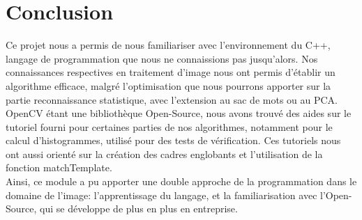\documentclass[10pt,a4paper]{report}
\begin{document}
\section{Conclusion}
Ce projet nous a permis de nous familiariser avec l'environnement du C++, langage de programmation que nous ne connaissions pas jusqu'alors. Nos connaissances respectives en traitement d'image nous ont permis d'établir un algorithme efficace, malgré l'optimisation que nous pourrons apporter sur la partie reconnaissance statistique, avec l'extension au sac de mots ou au PCA.\\
OpenCV étant une bibliothèque Open-Source, nous avons trouvé des aides sur le tutoriel fourni pour certaines parties de nos algorithmes, notamment pour le calcul d'histogrammes, utilisé pour des tests de vérification. Ces tutoriels nous ont aussi orienté sur la création des cadres englobants et l'utilisation de la fonction matchTemplate.\\
Ainsi, ce module a pu apporter une double approche de la programmation dans le domaine de l'image: l'apprentissage du langage, et la familiarisation avec l'Open-Source, qui se développe de plus en plus en entreprise.
\end{document}
